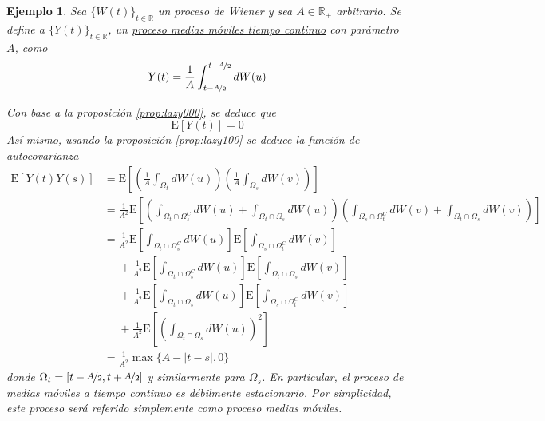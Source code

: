 \documentclass[12pt,letterpaper]{book}
\newtheorem{ejemplo}{Ejemplo}[chapter]
\newcommand{\R}{\mathbb{R}}
\newcommand{\E}[1]{\mathrm{E}\left[ #1 \right]}
\newcommand{\abso}[1]{\left| #1 \right|}
\newcommand{\pheq}{\phantom{=}}
\begin{document}
\begin{ejemplo}
Sea $\{ W(t)\}_{t\in\R}$ un proceso de Wiener y sea $A\in\R_+$ arbitrario. Se define a $\{Y(t)\}_{t\in\R}$, un \underline{proceso medias m\'oviles tiempo continuo} con parámetro $A$, como
\begin{equation}
Y(t) = \frac{1}{A}\int_{t-\nicefrac{A}{2}}^{t+\nicefrac{A}{2}} dW(u)
\end{equation}

Con base a la proposición \ref{prop:lazy000}, se deduce que
\begin{equation}
\E{Y(t)} = 0
\end{equation}
Así mismo, usando la proposición \ref{prop:lazy100} se deduce la función de autocovarianza
\begin{align*}
\E{Y(t)Y(s)} &= 
\E{ \left( \frac{1}{A}\int_{\Omega_t} dW(u) \right) \left( \frac{1}{A}\int_{\Omega_s} dW(v)\right) } \\
&= 
\frac{1}{A^2} 
\E{ 
\left( 
\int_{\Omega_t \cap \Omega_s^C} dW(u) + \int_{\Omega_t \cap \Omega_s} dW(u) 
\right)
\left( 
\int_{\Omega_s \cap \Omega_t^C} dW(v) + \int_{\Omega_t \cap \Omega_s} dW(v) 
\right)  
} \\
&=
\frac{1}{A^2} 
\E{  
\int_{\Omega_t \cap \Omega_s^C} dW(u)  
}
\E{
\int_{\Omega_s \cap \Omega_t^C} dW(v) 
} \\
&\pheq
+ \frac{1}{A^2} 
\E{ 
\int_{\Omega_t \cap \Omega_s^C} dW(u)  
}
\E{
 \int_{\Omega_t \cap \Omega_s} dW(v) 
} \\
&\pheq
+\frac{1}{A^2} 
\E{ 
\int_{\Omega_t \cap \Omega_s} dW(u) 
}
\E{
\int_{\Omega_s \cap \Omega_t^C} dW(v)
} \\
&\pheq
+\frac{1}{A^2} 
\E{ 
\left( 
\int_{\Omega_t \cap \Omega_s} dW(u) 
\right)^2
} \\
&= \frac{1}{A^2} \max \{ A-\abso{t-s}, 0 \}
\end{align*}
donde $\Omega_t = \left[ t - \nicefrac{A}{2}, t + \nicefrac{A}{2} \right]$ y similarmente para $\Omega_s$.
%
En particular, el proceso de medias móviles a tiempo continuo es débilmente estacionario.
%
Por simplicidad, este proceso será referido simplemente como \textit{proceso medias móviles}.
\end{ejemplo}

\end{document}
